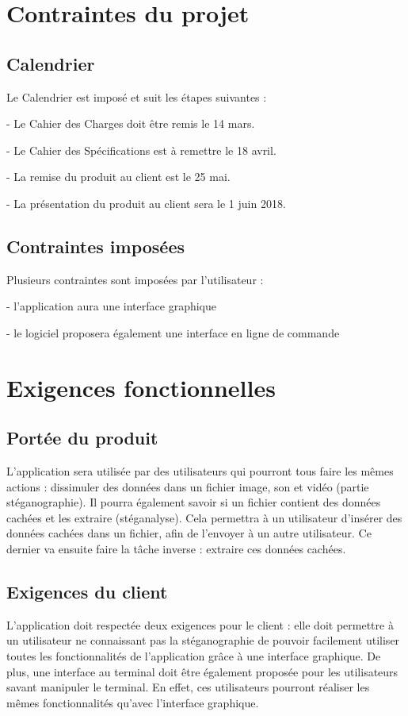 \documentclass[11pt]{article}
\begin{document}
\section{Contraintes du projet}

\subsection{Calendrier}

Le Calendrier est imposé et suit les étapes suivantes : 

- Le Cahier des Charges doit être remis le 14 mars. 

- Le Cahier des Spécifications est à remettre le 18 avril. 

- La remise du produit au client est le 25 mai. 

- La présentation du produit au client sera le 1 juin 2018.  


\subsection{Contraintes imposées} %
Plusieurs contraintes sont imposées par l'utilisateur : 
 
- l'application aura une interface graphique 

- le logiciel proposera également une interface en ligne de commande


\section{Exigences fonctionnelles}
\subsection{Portée du produit}
L'application sera utilisée par des utilisateurs qui pourront tous faire les mêmes actions : dissimuler des données dans un fichier image, son et vidéo (partie stéganographie). 
Il pourra également savoir si un fichier contient des données cachées et les extraire (stéganalyse). 
Cela permettra à un utilisateur d'insérer des données cachées dans un fichier, afin de l'envoyer à un autre utilisateur. Ce dernier va ensuite faire la tâche inverse : extraire ces données cachées. 

\subsection{Exigences du client}
L'application doit respectée deux exigences pour le client : elle doit permettre à un utilisateur ne connaissant pas la stéganographie de pouvoir facilement utiliser toutes les fonctionnalités de 
l'application grâce à une interface graphique. De plus, une interface au terminal doit être également proposée pour les utilisateurs savant manipuler le terminal. En effet, ces utilisateurs pourront réaliser les mêmes fonctionnalités qu'avec l'interface graphique. 
\end{document}
